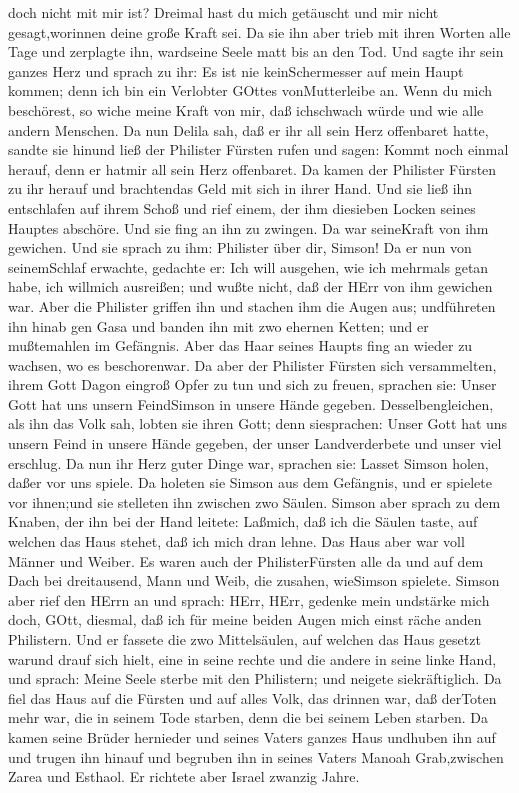 doch nicht mit mir ist? Dreimal hast du mich getäuscht und mir nicht
gesagt,worinnen deine große Kraft sei.  Da sie ihn aber
trieb mit ihren Worten alle Tage und zerplagte ihn, wardseine Seele matt
bis an den Tod.  Und sagte ihr sein ganzes Herz und sprach
zu ihr: Es ist nie keinSchermesser auf mein Haupt kommen; denn ich bin
ein Verlobter GOttes vonMutterleibe an. Wenn du mich beschörest, so
wiche meine Kraft von mir, daß ichschwach würde und wie alle andern
Menschen.  Da nun Delila sah, daß er ihr all sein Herz
offenbaret hatte, sandte sie hinund ließ der Philister Fürsten rufen und
sagen: Kommt noch einmal herauf, denn er hatmir all sein Herz
offenbaret. Da kamen der Philister Fürsten zu ihr herauf und brachtendas
Geld mit sich in ihrer Hand.  Und sie ließ ihn entschlafen
auf ihrem Schoß und rief einem, der ihm diesieben Locken seines Hauptes
abschöre. Und sie fing an ihn zu zwingen. Da war seineKraft von ihm
gewichen.  Und sie sprach zu ihm: Philister über dir,
Simson! Da er nun von seinemSchlaf erwachte, gedachte er: Ich will
ausgehen, wie ich mehrmals getan habe, ich willmich ausreißen; und wußte
nicht, daß der HErr von ihm gewichen war.  Aber die
Philister griffen ihn und stachen ihm die Augen aus; undführeten ihn
hinab gen Gasa und banden ihn mit zwo ehernen Ketten; und er mußtemahlen
im Gefängnis.  Aber das Haar seines Haupts fing an wieder
zu wachsen, wo es beschorenwar.  Da aber der Philister
Fürsten sich versammelten, ihrem Gott Dagon eingroß Opfer zu tun und
sich zu freuen, sprachen sie: Unser Gott hat uns unsern FeindSimson in
unsere Hände gegeben.  Desselbengleichen, als ihn das Volk
sah, lobten sie ihren Gott; denn siesprachen: Unser Gott hat uns unsern
Feind in unsere Hände gegeben, der unser Landverderbete und unser viel
erschlug.  Da nun ihr Herz guter Dinge war, sprachen sie:
Lasset Simson holen, daßer vor uns spiele. Da holeten sie Simson aus dem
Gefängnis, und er spielete vor ihnen;und sie stelleten ihn zwischen zwo
Säulen.  Simson aber sprach zu dem Knaben, der ihn bei der
Hand leitete: Laßmich, daß ich die Säulen taste, auf welchen das Haus
stehet, daß ich mich dran lehne.  Das Haus aber war voll
Männer und Weiber. Es waren auch der PhilisterFürsten alle da und auf
dem Dach bei dreitausend, Mann und Weib, die zusahen, wieSimson
spielete.  Simson aber rief den HErrn an und sprach: HErr,
HErr, gedenke mein undstärke mich doch, GOtt, diesmal, daß ich für meine
beiden Augen mich einst räche anden Philistern.  Und er
fassete die zwo Mittelsäulen, auf welchen das Haus gesetzt warund drauf
sich hielt, eine in seine rechte und die andere in seine linke Hand,
 und sprach: Meine Seele sterbe mit den Philistern; und
neigete siekräftiglich. Da fiel das Haus auf die Fürsten und auf alles
Volk, das drinnen war, daß derToten mehr war, die in seinem Tode
starben, denn die bei seinem Leben starben.  Da kamen seine
Brüder hernieder und seines Vaters ganzes Haus undhuben ihn auf und
trugen ihn hinauf und begruben ihn in seines Vaters Manoah Grab,zwischen
Zarea und Esthaol. Er richtete aber Israel zwanzig Jahre.

